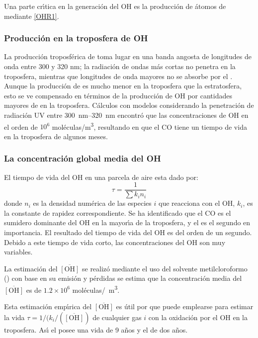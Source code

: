 Una parte cr\'{\i}tica en la generaci\'on del OH es la producci\'on de \'atomos de    mediante \ref{OHR1}. 

\subsubsection{Producci\'on en la troposfera de OH}
La producci\'on troposf\'erica de  toma lugar en una  banda angosta de longitudes de onda entre 300 y 320 nm; la radiaci\'on de ondas m\'as cortas no penetra en la troposfera, mientras que longitudes de onda mayores no se absorbe por el . Aunque la producci\'on de  es mucho menor en la troposfera que la estratosfera, esto se ve compensado en t\'erminos de la producci\'on de OH por cantidades mayores de  en la troposfera. C\'alculos con modelos considerando la penetraci\'on de radiaci\'on \gls{UV} entre \SIrange{300}{320}{\nano\metre}  encontr\'o que las concentraciones de OH en el orden de $10^6$ mol\'eculas/\si{\cubic\metre}, resultando en que el CO tiene un tiempo de vida en la troposfera de algunos meses.
\subsubsection{La concentraci\'on global media del OH}
El tiempo de vida del OH en una parcela de aire esta dado por:
\begin{equation*}
\tau=\frac{1}{\sum k_in_i}
\end{equation*}
donde $n_i$ es la densidad num\'erica de las especies $i$ que reacciona con el OH, $k_i$, es la constante de rapidez  correspondiente. Se ha identificado que el CO es el sumidero dominante del OH en la mayor\'{\i}a de la troposfera, y el  es el segundo en importancia. El resultado del tiempo de vida del OH es del orden de un segundo. Debido a este tiempo de vida corto, las concentraciones del OH son muy variables.

La estimaci\'on del  $\overline{[\mathrm{OH}]}$ se realiz\'o mediante el uso del solvente metilcloroformo () con base en su emisi\'on y p\'erdidas se estima que la concentraci\'on media del  $\overline{[\mathrm{OH}]}$ es de $1.2\times10^6$ mol\'eculas/\si{\centi\cubic\metre}.

Esta estimaci\'on emp\'{\i}rica del   $\overline{[\mathrm{OH}]}$ es \'util por que puede emplearse para estimar la vida  $\tau=1/(k_i/(\overline{[\mathrm{OH}]})$ de cualquier gas $i$ con la oxidaci\'on por el OH en la troposfera. As\'{\i} el  posee una vida de 9 a\~nos y el  de dos a\~nos.

